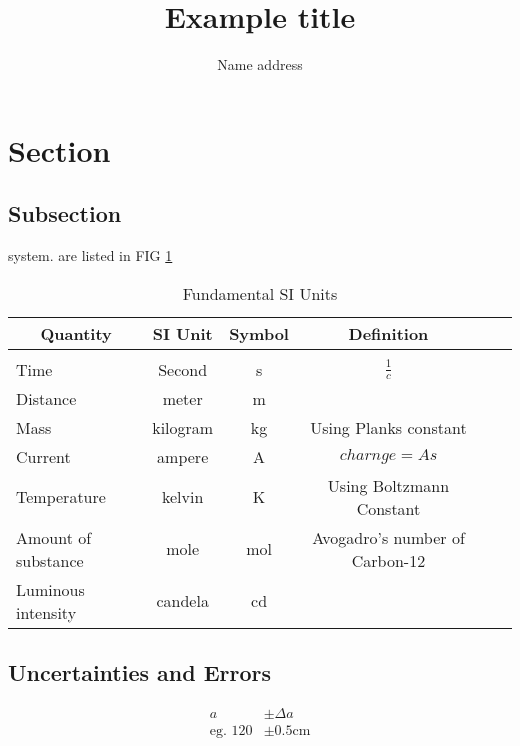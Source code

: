 \documentclass[12pt]{article} %
\title{Example title}
\author{\name Name \addr address}
\begin{document}
\maketitle

\begin{abstract}

\end{abstract}


\tableofcontents
\newpage

\section{Section}
\subsection{Subsection}

system. \cite{bacar_2011_verhulst} are listed in FIG \ref{table-si-fundamental}

\begin{table}[H]
  \centering
  \caption{Fundamental SI Units}
  \label{table-si-fundamental}
\begin{tabular}{lccccl}\toprule

  \multicolumn{1}{c}{Quantity} & \multicolumn{1}{c}{SI Unit} & \multicolumn{1}{c}{Symbol} & \multicolumn{1}{c}{Definition} 
  \\ \hline \\
  Time & Second & \si{\second} & $\frac{1}{c}$ \\
  Distance & meter & \si{\metre} \\
  Mass	& kilogram	 & \si{\kilogram} & Using Planks constant\\
  Current & ampere & \si{\ampere} & $charnge = As$\\
  Temperature	& kelvin & \si{\kelvin} & Using Boltzmann Constant\\
  Amount of substance	& mole & \si{\mole} & Avogadro's number of Carbon-12\\
  Luminous intensity & candela & \si{\candela} \\
  \bottomrule
  \end{tabular}
\end{table}

\subsection{Uncertainties and Errors}
\begin{align}
  a &\pm \Delta a \\
  \text{eg. }
  120 &\pm 0.5 \si{\cm}
\end{align}
\newpage
\end{document}
